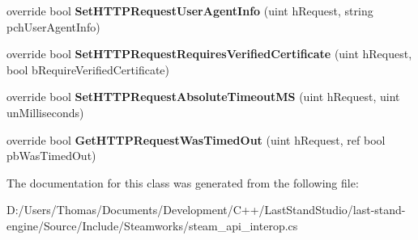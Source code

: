 \begin{DoxyCompactItemize}
\item 
\hypertarget{classValve_1_1Steamworks_1_1CSteamHTTP_a80ea877351c612cd484a1f4849c3b6c1}{}override bool {\bfseries Set\+H\+T\+T\+P\+Request\+User\+Agent\+Info} (uint h\+Request, string pch\+User\+Agent\+Info)\label{classValve_1_1Steamworks_1_1CSteamHTTP_a80ea877351c612cd484a1f4849c3b6c1}

\item 
\hypertarget{classValve_1_1Steamworks_1_1CSteamHTTP_a776da2b1217646560372df0ab123ad09}{}override bool {\bfseries Set\+H\+T\+T\+P\+Request\+Requires\+Verified\+Certificate} (uint h\+Request, bool b\+Require\+Verified\+Certificate)\label{classValve_1_1Steamworks_1_1CSteamHTTP_a776da2b1217646560372df0ab123ad09}

\item 
\hypertarget{classValve_1_1Steamworks_1_1CSteamHTTP_a7dc9c7f410fe708f0cea7d4a5914c1aa}{}override bool {\bfseries Set\+H\+T\+T\+P\+Request\+Absolute\+Timeout\+M\+S} (uint h\+Request, uint un\+Milliseconds)\label{classValve_1_1Steamworks_1_1CSteamHTTP_a7dc9c7f410fe708f0cea7d4a5914c1aa}

\item 
\hypertarget{classValve_1_1Steamworks_1_1CSteamHTTP_aa38dcc6954263b26d934d7704ccda823}{}override bool {\bfseries Get\+H\+T\+T\+P\+Request\+Was\+Timed\+Out} (uint h\+Request, ref bool pb\+Was\+Timed\+Out)\label{classValve_1_1Steamworks_1_1CSteamHTTP_aa38dcc6954263b26d934d7704ccda823}

\end{DoxyCompactItemize}


The documentation for this class was generated from the following file\+:\begin{DoxyCompactItemize}
\item 
D\+:/\+Users/\+Thomas/\+Documents/\+Development/\+C++/\+Last\+Stand\+Studio/last-\/stand-\/engine/\+Source/\+Include/\+Steamworks/steam\+\_\+api\+\_\+interop.\+cs\end{DoxyCompactItemize}
